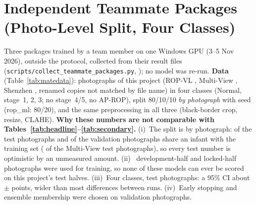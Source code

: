 \documentclass[conference]{IEEEtran}
\begin{document}
\begin{table}[!t]
\caption{Retired ResNet50 binary screener: external audit at the unseen hospital (663 dev photographs). \emph{Caveat}: its threshold was set at another hospital; the v2 dev AUC is in-sample for v2's own threshold choice.}
\label{tab:screener}
\centering\scriptsize\setlength{\tabcolsep}{3pt}

\end{table}

\section{Independent Teammate Packages (Photo-Level Split, Four Classes)}\label{sec:mate}
Three packages trained by a team member on one Windows GPU (3--5 Nov 2026), outside the protocol, collected from their result files (\texttt{scripts/collect\_teammate\_packages.py}, \texttt{\mateCommit}); no model was re-run. \textbf{Data} (Table~\ref{tab:matedata}): \mateN{} photographs of this project (ROP-VL \mateSrcRopvl{}, Multi-View \mateSrcMultiview{}, Shenzhen \mateSrcShenzhen{}, \mateUnmatched{} renamed copies not matched by file name) in four classes (Normal, stage~1, 2, 3; no stage~4/5, no AP-ROP), split 80/10/10 \emph{by photograph} with seed \seedA{} (rop\_ml: 80/20), and the same preprocessing in all three (black-border crop, resize, CLAHE). \textbf{Why these numbers are not comparable with Tables~\ref{tab:headline}--\ref{tab:secondary}.} (i)~The split is by photograph: \mateLeakTest{} of the test photographs and \mateLeakVal{} of the validation photographs share an infant with the training set (\mateLeakMV{} of the Multi-View test photographs), so every test number is optimistic by an unmeasured amount. (ii)~\mateDevTrain{} development-half and \mateLockedTrain{} locked-half photographs were used for training, so none of these models can ever be scored on this project's test halves. (iii)~Four classes, \mateTest{} test photographs: a 95\% CI about $\pm$\mateHalfWidth{} points, wider than most differences between runs. (iv)~Early stopping and ensemble membership were chosen on \mateVal{} validation photographs.
\end{document}
